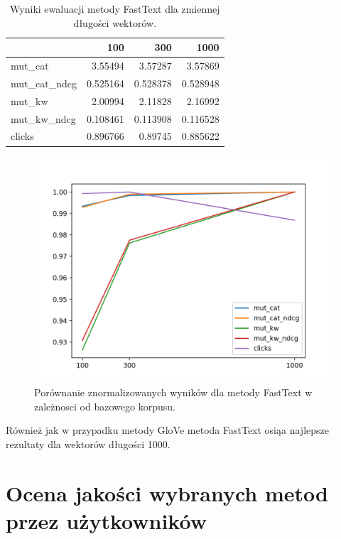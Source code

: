 \documentclass[pl]{minipw} %
\begin{document}
\begin{table}[H]
	\centering
	\begin{tabular}{lrrr}
		\hline
		&      100 &      300 &     1000 \\
		\hline
		mut\_cat      & 3.55494  & 3.57287  & 3.57869  \\
		mut\_cat\_ndcg & 0.525164 & 0.528378 & 0.528948 \\
		mut\_kw       & 2.00994  & 2.11828  & 2.16992  \\
		mut\_kw\_ndcg  & 0.108461 & 0.113908 & 0.116528 \\
		clicks       & 0.896766 & 0.89745  & 0.885622 \\
		\hline
	\end{tabular}
	\caption{Wyniki ewaluacji metody FastText dla zmiennej długości wektorów.}
\end{table}

\begin{figure}[H]
	\centering
	\includegraphics[width=1\textwidth]{img/results/ft_ctr.png}
	\caption{Porównanie znormalizowanych wyników dla metody FastText w zależnosci od bazowego korpusu.}
\end{figure}

Również jak w przypadku metody GloVe metoda FastText osiąa najlepsze rezultaty dla wektorów długości 1000.

\section{Ocena jakości wybranych metod przez użytkowników}
\end{document}
